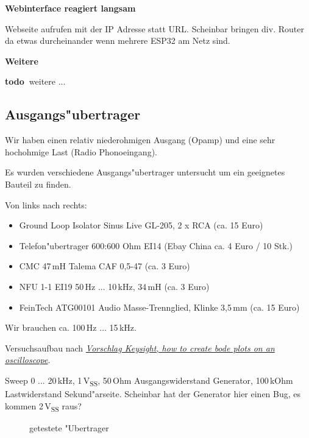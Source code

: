 \documentclass[ngerman,11pt,parskip=half] {scrartcl}
\newcommand {\todo} {\textbf{\color{red} todo\ }}
\begin{document}
\textbf{Webinterface reagiert langsam}

Webseite aufrufen mit der IP Adresse statt URL. Scheinbar bringen div. Router da etwas durcheinander wenn mehrere ESP32 am Netz sind.

\textbf{Weitere}

\todo weitere ...

\subsection{Ausgangs"ubertrager} \label{sec:untersuchung:ausgangsuebertrager}

Wir haben einen relativ niederohmigen Ausgang (Opamp) und eine sehr hochohmige Last (Radio Phonoeingang).

Es wurden verschiedene Ausgangs"ubertrager untersucht um ein geeignetes Bauteil zu finden. 

Von links nach rechts:
\begin{itemize}
\item Ground Loop Isolator Sinus Live GL-205, 2 x RCA (ca. 15 Euro)
\item Telefon"ubertrager 600:600 Ohm EI14 (Ebay China ca. 4 Euro / 10 Stk.)
\item CMC 47\,mH Talema CAF 0,5-47 (ca. 3 Euro)
\item NFU 1-1 EI19 50\,Hz ... 10\,kHz, 34\,mH (ca. 3 Euro)
\item FeinTech ATG00101 Audio Masse-Trennglied, Klinke 3,5\,mm (ca. 15 Euro)
\end{itemize}

Wir brauchen ca. 100\,Hz ... 15\,kHz.

Versuchsaufbau nach \emph{\href{https://keysightoscilloscopes.wordpress.com/2016/04/13/how-to-create-bode-plots-on-an-oscilloscope/}{Vorschlag Keysight, how to create bode plots on an oscilloscope}}.

Sweep 0 ... 20\,kHz, 1\,V\textsubscript{SS}, 50\,Ohm Ausgangswiderstand Generator, 100\,kOhm Lastwiderstand Sekund"arseite. Scheinbar hat der Generator hier einen Bug, es kommen 2\,V\textsubscript{SS} raus?

\begin{figure}[H]
\centering
{}
\caption{getestete "Ubertrager} \label{fig:1}
\end{figure}
\end{document}
